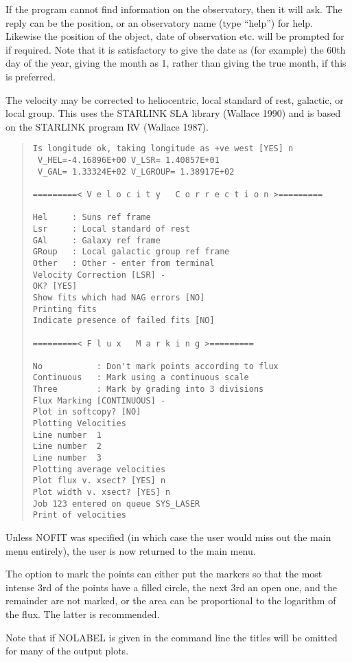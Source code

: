 If the program cannot find information on the observatory, then it will
ask.
The reply can be the position, or an observatory name (type
``help'') for help.
Likewise the position of the object, date of observation etc. will be
prompted for if required.
Note that it is satisfactory to give the date as (for example) the 60th
day of the year, giving the month as 1, rather than giving the true
month, if this is preferred.

The velocity may be corrected to heliocentric, local standard of rest,
galactic, or local group.
This uses the STARLINK SLA library (Wallace 1990) and is based on the
STARLINK program RV (Wallace 1987).

\begin{quote}\begin{verbatim}
Is longitude ok, taking longitude as +ve west [YES] n
 V_HEL=-4.16896E+00 V_LSR= 1.40857E+01
 V_GAL= 1.33324E+02 V_LGROUP= 1.38917E+02
 
=========< V e l o c i t y   C o r r e c t i o n >=========
 
Hel     : Suns ref frame
Lsr     : Local standard of rest
GAl     : Galaxy ref frame
GRoup   : Local galactic group ref frame
Other   : Other - enter from terminal
Velocity Correction [LSR] -
OK? [YES]
Show fits which had NAG errors [NO]
Printing fits
Indicate presence of failed fits [NO]
 
=========< F l u x   M a r k i n g >=========
 
No           : Don't mark points according to flux
Continuous   : Mark using a continuous scale
Three        : Mark by grading into 3 divisions
Flux Marking [CONTINUOUS] -
Plot in softcopy? [NO]
Plotting Velocities
Line number  1
Line number  2
Line number  3
Plotting average velocities
Plot flux v. xsect? [YES] n
Plot width v. xsect? [YES] n
Job 123 entered on queue SYS_LASER
Print of velocities
\end{verbatim}\end{quote}
Unless NOFIT was specified (in which case the user would miss out
the main menu entirely), the user is now returned to the main menu.

The option to mark the points can either put the markers so that the
most intense 3rd of the points have a filled circle, the next 3rd an
open one, and the remainder are not marked, or the area can be
proportional to the logarithm of the flux.
The latter is recommended.

Note that if NOLABEL is given in the command line the titles will be
omitted for many of the output plots.

